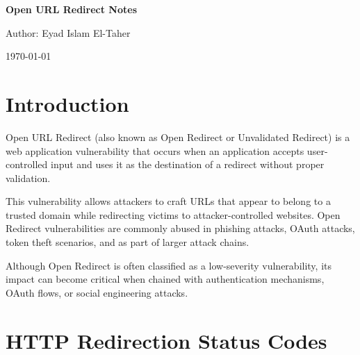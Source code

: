\documentclass{article}
\begin{document}
\begin{titlepage}
\centering

\author{Eyad Islam El-Taher}
{\Huge\bfseries Open URL Redirect Notes \par}

\vspace{0.5cm} 

{\Large Author: Eyad Islam El-Taher \par}

\vspace{0.5cm}

{\large \today \par}

\vfill

\end{titlepage}






\section{Introduction}

Open URL Redirect (also known as Open Redirect or Unvalidated Redirect) is a web application vulnerability that occurs when an application accepts user-controlled input and uses it as the destination of a redirect without proper validation.

This vulnerability allows attackers to craft URLs that appear to belong to a trusted domain while redirecting victims to attacker-controlled websites. Open Redirect vulnerabilities are commonly abused in phishing attacks, OAuth attacks, token theft scenarios, and as part of larger attack chains.

\begin{notebox}
Although Open Redirect is often classified as a low-severity vulnerability, its impact can become critical when chained with authentication mechanisms, OAuth flows, or social engineering attacks.
\end{notebox}


\section{HTTP Redirection Status Codes}
\end{document}
